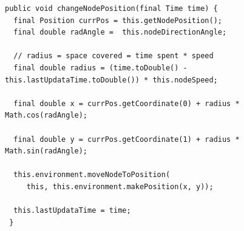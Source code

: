 \documentclass[12pt,a4paper,openright,twoside]{report}
\begin{document}
\begin{lstlisting}[firstnumber=1,label={lst:changeNodePosition},caption={Implementazione spostamento nodo}]
public void changeNodePosition(final Time time) {
  final Position currPos = this.getNodePosition();
  final double radAngle =  this.nodeDirectionAngle;

  // radius = space covered = time spent * speed
  final double radius = (time.toDouble() - this.lastUpdataTime.toDouble()) * this.nodeSpeed;

  final double x = currPos.getCoordinate(0) + radius * Math.cos(radAngle);

  final double y = currPos.getCoordinate(1) + radius * Math.sin(radAngle);

  this.environment.moveNodeToPosition(
     this, this.environment.makePosition(x, y));

  this.lastUpdataTime = time;
 }
\end{lstlisting}
\end{document}

